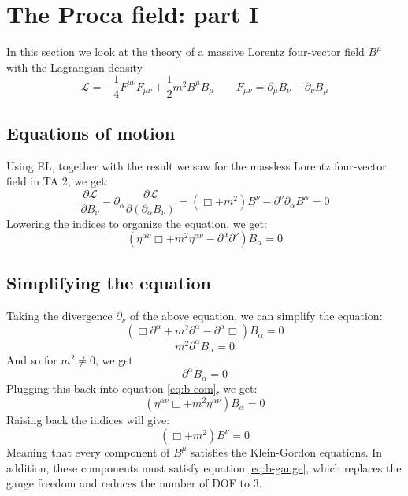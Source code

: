 \documentclass{article}
\let\breaklesssection\section
\renewcommand\section{\clearpage\breaklesssection}
\begin{document}
\section{The Proca field: part I}
In this section we look at the theory of a massive Lorentz four-vector field $B^\mu$ with the Lagrangian density
\begin{equation}
    \mathcal{L} = -\frac{1}{4}F^{\mu\nu}F_{\mu\nu} + \frac{1}{2}m^2B^\mu B_\mu
    \qquad
    F_{\mu\nu} = \partial_\mu B_\nu - \partial_\nu B_\mu
\end{equation}
\subsection{Equations of motion}
Using EL, together with the result we saw for the massless Lorentz four-vector field in TA 2, we get:
\begin{equation}
    \frac{\partial \mathcal{L}}{\partial B_\nu} - \partial_\alpha \frac{\partial \mathcal{L}}{\partial\left(\partial_\alpha B_\nu\right)} =  (\Box + m^2)B^\nu - \partial^\nu \partial_\alpha B^\alpha = 0
\end{equation}
Lowering the indices to organize the equation, we get:
\begin{equation}
\label{eq:b-eom}
    \left(
        \eta^{\alpha\nu}\Box + m^2\eta^{\alpha\nu} - \partial^\alpha \partial^\nu
    \right) B_\alpha = 0
\end{equation}
\subsection{Simplifying the equation}
Taking the divergence $\partial_\nu$ of the above equation, we can simplify the equation:
\begin{equation}
    \left(
        \Box\partial^\alpha + m^2\partial^\alpha - \partial^\alpha \Box
    \right) B_\alpha = 0
\end{equation}
\begin{equation}
    m^2 \partial^\alpha B_\alpha = 0
\end{equation}
And so for $m^2 \ne 0$, we get
\begin{equation}
\label{eq:b-gauge}
    \partial^\alpha B_\alpha = 0
\end{equation}
Plugging this back into equation \ref{eq:b-eom}, we get:
\begin{equation}
    \left(
        \eta^{\alpha\nu}\Box + m^2\eta^{\alpha\nu}
    \right) B_\alpha = 0
\end{equation}
Raising back the indices will give:
\begin{equation}
    \left(
        \Box + m^2
    \right) B^\nu = 0
\end{equation}
Meaning that every component of $B^\mu$ satisfies the Klein-Gordon equations. In addition, these components must satisfy equation \ref{eq:b-gauge}, which replaces the gauge freedom and reduces the number of DOF to 3.
\end{document}
